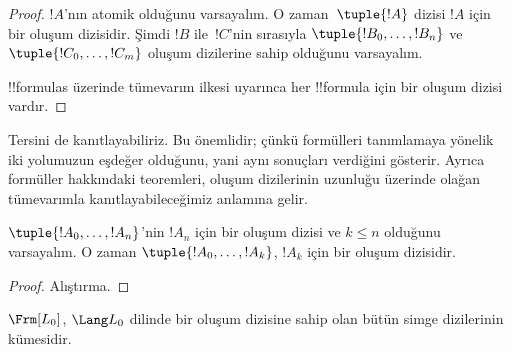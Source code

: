 \begin{proof}
$!A$'nın atomik olduğunu varsayalım. O zaman~$\tuple{!A}$ dizisi $!A$ için
bir oluşum dizisidir.
%
Şimdi $!B$ ile~$!C$'nin sırasıyla $\tuple{!B_0,\dotsc,!B_n}$ ve
$\tuple{!C_0,\dotsc,!C_m}$ oluşum dizilerine sahip olduğunu varsayalım.
%
\begin{enumerate}
\end{enumerate}
!!{formula}s üzerinde tümevarım ilkesi uyarınca her !!{formula} için bir
oluşum dizisi vardır.
\end{proof}

Tersini de kanıtlayabiliriz. Bu önemlidir; çünkü formülleri tanımlamaya
yönelik iki yolumuzun eşdeğer olduğunu, yani aynı sonuçları verdiğini
gösterir. Ayrıca formüller hakkındaki teoremleri, oluşum dizilerinin uzunluğu
üzerinde olağan tümevarımla kanıtlayabileceğimiz anlamına gelir.

\begin{lem}
$\tuple{!A_0,\dotsc,!A_n}$'nin $!A_n$ için bir oluşum dizisi ve $k \leq n$
olduğunu varsayalım. O zaman $\tuple{!A_0,\dotsc,!A_k}$, $!A_k$ için bir
oluşum dizisidir.
\end{lem}

\begin{proof}
Alıştırma.
\end{proof}

\begin{thm}
$\Frm[L_0]$, $\Lang L_0$ dilinde bir oluşum dizisine sahip olan bütün simge
dizilerinin kümesidir.
\end{thm}

